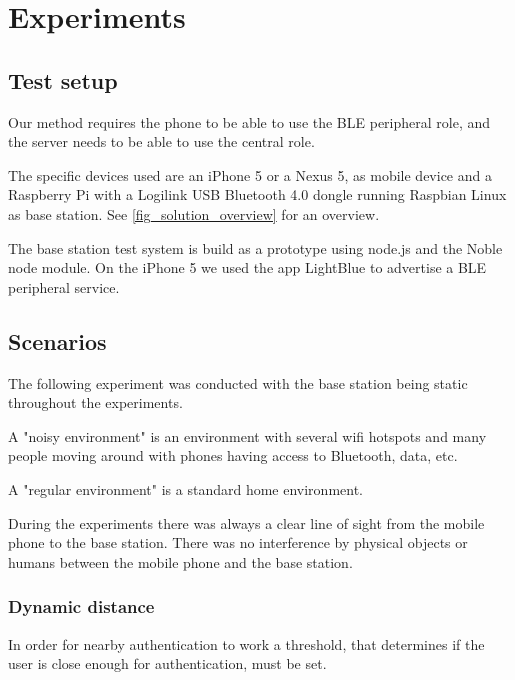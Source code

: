 \section{Experiments}

\subsection{Test setup}

Our method requires the phone to be able to use the BLE peripheral role, and the server needs to be able to use the central role.

The specific devices used are an iPhone 5 or a Nexus 5, as mobile device and a Raspberry Pi with a Logilink USB Bluetooth 4.0 dongle running Raspbian Linux\cite{ref:raspbian} as base station. See \cref{fig_solution_overview} for an overview.

The base station test system is build as a prototype using node.js\cite{ref:node} and the Noble node module.
On the iPhone 5 we used the app LightBlue\cite{ref:Lightblue} to advertise a BLE peripheral service.


\subsection{Scenarios}

The following experiment was conducted with the base station being static throughout the experiments.

A "noisy environment" is an environment with several wifi hotspots and many people moving around with phones having access to Bluetooth, data, etc.

A "regular environment" is a standard home environment.

During the experiments there was always a clear line of sight from the mobile phone to the base station. There was no interference by physical objects or humans between the mobile phone and the base station.


\subsubsection{Dynamic distance}
\label{section:MovingTowardsSystem}
In order for nearby authentication to work a threshold, that determines if the user is close enough for authentication, must be set.

